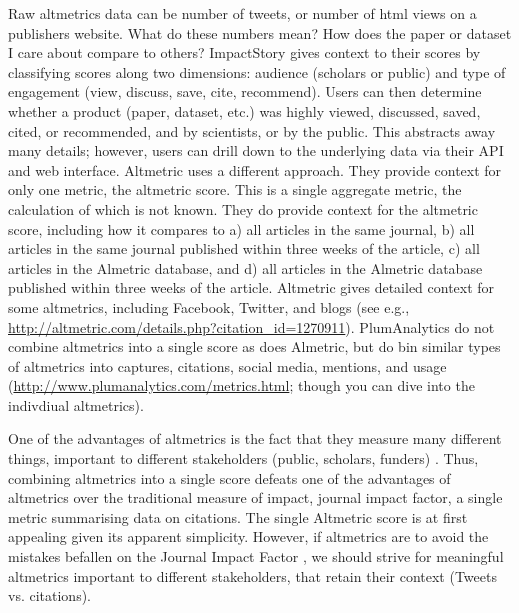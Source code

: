 \documentclass[letterpaper,superscriptaddress,showkeys,longbibliography]{revtex4-1}\usepackage{graphicx, color}
\begin{document}
Raw altmetrics data can be number of tweets, or number of html views on a publishers website. What do these numbers mean? How does the paper or dataset I care about compare to others? ImpactStory gives context to their scores by classifying scores along two dimensions: audience (scholars or public) and type of engagement (view, discuss, save, cite, recommend). Users can then determine whether a product (paper, dataset, etc.) was highly viewed, discussed, saved, cited, or recommended, and by scientists, or by the public. This abstracts away many details; however, users can drill down to the underlying data via their API and web interface.  Altmetric uses a different approach. They provide context for only one metric, the altmetric score. This is a single aggregate metric, the calculation of which is not known. They do provide context for the altmetric score, including how it compares to a) all articles in the same journal, b) all articles in the same journal published within three weeks of the article, c) all articles in the Almetric database, and d) all articles in the Almetric database published within three weeks of the article. Altmetric gives detailed context for some altmetrics, including Facebook, Twitter, and blogs (see e.g., \url{http://altmetric.com/details.php?citation_id=1270911}). PlumAnalytics do not combine altmetrics into a single score as does Almetric, but do bin similar types of altmetrics into captures, citations, social media, mentions, and usage (\url{http://www.plumanalytics.com/metrics.html}; though you can dive into the indivdiual altmetrics). 

One of the advantages of altmetrics is the fact that they measure many different things, important to different stakeholders (public, scholars, funders) \cite{x,y}. Thus, combining altmetrics into a single score defeats one of the advantages of altmetrics over the traditional measure of impact, journal impact factor, a single metric summarising data on citations. The single Altmetric score is at first appealing given its apparent simplicity. However, if altmetrics are to avoid the mistakes befallen on the Journal Impact Factor \cite{ploseditorial}, we should strive for meaningful altmetrics important to different stakeholders, that retain their context (Tweets vs. citations). 
\end{document}
